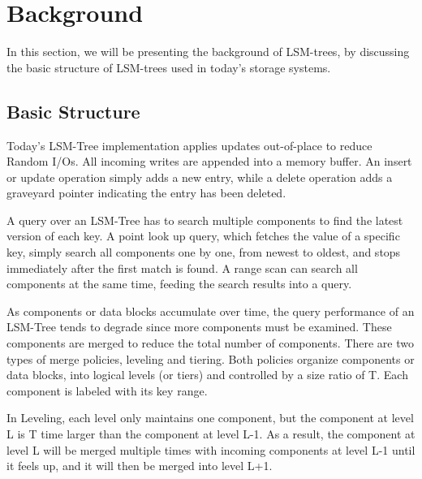 \documentclass[sigconf]{acmart}
\begin{document}
    \section{Background}

    In this section, we will be presenting the background of LSM-trees, by discussing the basic structure of LSM-trees used in today's storage systems.

    \subsection{Basic Structure}
    Today's LSM-Tree implementation applies updates out-of-place to reduce Random I/Os. All incoming writes are appended into a memory buffer. An insert or update operation simply adds a new entry, while a delete operation adds a graveyard pointer indicating the entry has been deleted.

    A query over an LSM-Tree has to search multiple components to find the latest version of each key. A point look up query, which fetches the value of a specific key, simply search all components one by one, from newest to oldest, and stops immediately after the first match is found. A range scan can search all components at the same time, feeding the search results into a query.

    As components or data blocks accumulate over time, the query performance of an LSM-Tree tends to degrade since more components must be examined. These components are merged to reduce the total number of components. There are two types of merge policies, leveling and tiering. Both policies organize components or data blocks, into logical levels (or tiers) and controlled by a size ratio of T. Each component is labeled with its key range.

    In Leveling, each level only maintains one component, but the component at level L is T time larger than the component at level L-1. As a result, the component at level L will be merged multiple times with incoming components at level L-1 until it feels up, and it will then be merged into level L+1.
\end{document}
